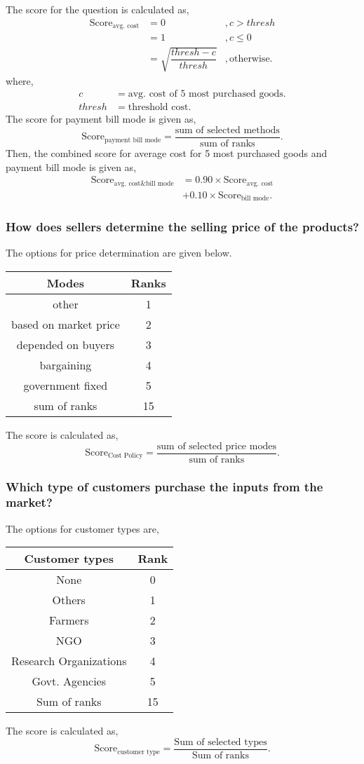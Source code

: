 \documentclass[oneside,twocolumn]{article}
\newcommand{\tsub}[2]{\text{#1}_{\text{#2}}}
\newcommand{\dsub}[2]{\dfrac{\text{#1}}{\text{#2}}}
\newenvironment{ttable}
               {\begin{center}
                 \begin{tabular}{c|c}
                   \hline
                   }
                   { \\ \hline
                 \end{tabular}
               \end{center}
               }
\begin{document}
The score for the question is calculated as,
\begin{align*}
  \tsub{Score}{avg. cost} &= 0 &, c > thresh \\
  &= 1 &, c \le 0 \\
  &= \sqrt{\dfrac{thresh - c}{thresh}} &, \text{otherwise}.
\end{align*}
where,
\begin{align*}
  c &= \text{avg. cost of 5 most purchased goods}. \\
  thresh &= \text{threshold cost}.
\end{align*}
The score for payment bill mode is given as,
\[
\tsub{Score}{payment bill mode} = \dsub{sum of selected methods}{sum of ranks}.
\]
Then, the combined score for average cost for 5 most purchased goods and
payment bill mode is given as,
\begin{align*}
  \tsub{Score}{avg. cost\&bill mode} &= 0.90 \times \tsub{Score}{avg. cost} \\
  &+ 0.10 \times \tsub{Score}{bill mode}.
\end{align*}

\subsubsection{How does sellers determine the selling price of the products?}
The options for price determination are given below.
\begin{center}
  \begin{tabular}{c|c}
    \hline
    Modes & Ranks \\ \hline
    other & 1 \\
    based on market price & 2 \\
    depended on buyers & 3 \\
    bargaining & 4 \\
    government fixed & 5 \\ \hline
    sum of ranks & 15 \\ \hline
  \end{tabular}
\end{center}
The score is calculated as,
\[
\text{Score}_{\text{Cost Policy}} = \dfrac{\text{sum of selected price modes}}{\text{sum of ranks}}.
\]

\subsubsection{Which type of customers purchase the inputs from the market?}
The options for customer types are,
\begin{ttable}
  Customer types & Rank \\ \hline
  None & 0 \\
  Others & 1 \\
  Farmers & 2 \\
  NGO & 3 \\
  Research Organizations & 4 \\
  Govt. Agencies & 5 \\ \hline
  Sum of ranks & 15
\end{ttable}
The score is calculated as,
\[
\tsub{Score}{customer type} = \dsub{Sum of selected types}{Sum of ranks}.
\]
\end{document}
